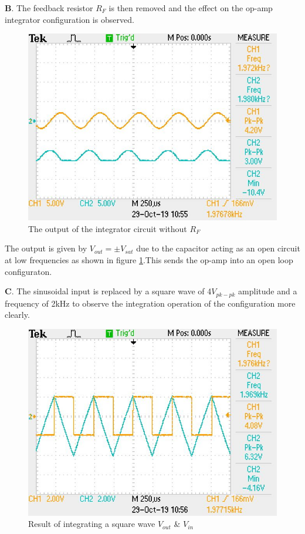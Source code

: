 \documentclass[12pt, titlepage]{article}
\theoremstyle{definition}
\begin{document}
    \textbf{B}. The feedback resistor $R_F$ is then removed and the effect on the op-amp integrator configuration is observed.

    \begin{figure}
      \includegraphics[scale=0.25]{images/results_q2.jpeg}
      \caption{The output of the integrator circuit without $R_F$}
      \label{fig:results_q2}
    \end{figure}

    The output is given by $V_{out}=\pm V_{sat}$ due to the capacitor acting as an open circuit at low frequencies as shown in figure \ref{fig:results_q2}.This sends the op-amp into an open loop configuraton.

    \textbf{C}. The sinusoidal input is replaced by a square wave of 4$V_{pk-pk}$ amplitude and a frequency of 2kHz to observe the integration operation of the configuration more clearly.

    \begin{figure}
      \includegraphics[scale=0.25]{images/results_q3.jpeg}
      \caption{Result of integrating a square wave \color{cyan}$V_{out}$ \color{black}\& \color{orange}$V_{in}$}
      \label{fig:results_q3}
    \end{figure}
\end{document}
